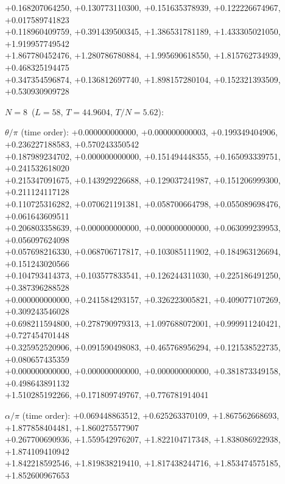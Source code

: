 \begin{flushleft}
+0.168207064250, +0.130773110300, +0.151635378939, +0.122226674967, +0.017589741823 \\
+0.118960409759, +0.391439500345, +1.386531781189, +1.433305021050, +1.919957749542 \\
+1.867780452476, +1.280786780884, +1.995690618550, +1.815762734939, +0.468325194475 \\
+0.347354596874, +0.136812697740, +1.898157280104, +0.152321393509, +0.530930909728
\vspace{3pt}\par\noindent\textbf{$N=8$}\ ($L=58$, $T=44.9604$, $T/N=5.62$):
\par\noindent$\theta/\pi$ (time order):
+0.000000000000, +0.000000000003, +0.199349404906, +0.236227188583, +0.570243350542 \\
+0.187989234702, +0.000000000000, +0.151494448355, +0.165093339751, +0.241532618020 \\
+0.215347091675, +0.143929226688, +0.129037241987, +0.151206999300, +0.211124117128 \\
+0.110725316282, +0.070621191381, +0.058700664798, +0.055089698476, +0.061643609511 \\
+0.206803358639, +0.000000000000, +0.000000000000, +0.063099239953, +0.056097624098 \\
+0.057698216330, +0.068706717817, +0.103085111902, +0.184963126694, +0.151243020566 \\
+0.104793414373, +0.103577833541, +0.126244311030, +0.225186491250, +0.387396288528 \\
+0.000000000000, +0.241584293157, +0.326223005821, +0.409077107269, +0.309243546028 \\
+0.698211594800, +0.278790979313, +1.097688072001, +0.999911240421, +0.727454701448 \\
+0.325952520906, +0.091590498083, +0.465768956294, +0.121538522735, +0.080657435359 \\
+0.000000000000, +0.000000000000, +0.000000000000, +0.381873349158, +0.498643891132 \\
+1.510285192266, +0.171809749767, +0.776781914041
\par\noindent$\alpha/\pi$ (time order):
+0.069448863512, +0.625263370109, +1.867562668693, +1.877858404481, +1.860275577907 \\
+0.267700690936, +1.559542976207, +1.822104717348, +1.838086922938, +1.874109410942 \\
+1.842218592546, +1.819838219410, +1.817438244716, +1.853474575185, +1.852600967653 \\

\end{flushleft}
